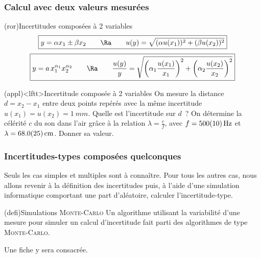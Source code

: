 \documentclass[../../main/main.tex]{subfiles}
\begin{document}
\subsubsection{Calcul avec deux valeurs mesurées}
\begin{tcb*}(ror){Incertitudes composées à 2 variables}
	\[
		\boxed{
			y = \alpha x_1 \pm \beta x_2
			\qquad \Ra \qquad
			u(y) = \sqrt{(\alpha u(x_1))^{2} + (\beta u(x_2))^{2}}}
	\]
	\tcblower
	\[
		\boxed{
		y = a\,x_1^{\alpha_1}x_2^{\alpha_2}
		\qquad \Ra \qquad
		\frac{u(y)}{y} = \sqrt{
			\left(\alpha_1\frac{u(x_1)}{x_1}\right)^{2} +
			\left(\alpha_2\frac{u(x_2)}{x_2}\right)^{2}
		}
		}
	\]
\end{tcb*}

\begin{tcb*}[breakable](appl)<lftt>{Incertitude composée à 2 variables}
	On mesure la distance $d = x_2 - x_1$ entre deux points repérés avec la même
	incertitude $u(x_1) = u(x_2) = \SI{1}{mm}$. Quelle est l'incertitude sur $d$~?
	\smallbreak
	\tcblower
	On détermine la célérité $c$ du son dans l'air grâce à la relation $\lambda =
		\frac{c}{f}$, avec $f = \SI{500 \pm 10}{Hz}$ et $\lambda = \SI{68.0 \pm
			2.5}{cm}$. Donner sa valeur.
	\smallbreak
\end{tcb*}

\subsubsection{Incertitudes-types composées quelconques}
Seuls les cas simples et multiples sont à connaître. Pour tous les autres cas,
nous allons revenir à la définition des incertitudes puis, à l'aide d'une
simulation informatique comportant une part d'aléatoire, calculer
l'incertitude-type.

\begin{tcb}(defi){Simulations \textsc{Monte-Carlo}}
	Un algorithme utilisant la variabilité d'une mesure pour simuler un calcul
	d'incertitude fait parti des algorithmes de type \textsc{Monte-Carlo}.
\end{tcb}

Une fiche y sera consacrée.
\end{document}
